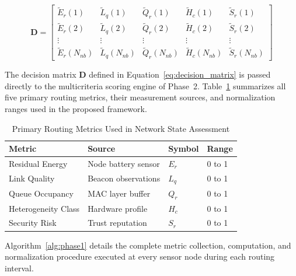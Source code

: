 \documentclass[a4paper,fleqn]{cas-dc}
\numberwithin{equation}{section}
\begin{document}
\begin{equation}
\label{eq:decision_matrix}
\mathbf{D} =
\begin{bmatrix}
\tilde{E}_r(1) & \tilde{L}_q(1) & \tilde{Q}_r(1)
  & \tilde{H}_c(1) & \tilde{S}_r(1) \\
\tilde{E}_r(2) & \tilde{L}_q(2) & \tilde{Q}_r(2)
  & \tilde{H}_c(2) & \tilde{S}_r(2) \\
\vdots & \vdots & \vdots & \vdots & \vdots \\
\tilde{E}_r(N_{nb}) & \tilde{L}_q(N_{nb}) & \tilde{Q}_r(N_{nb})
  & \tilde{H}_c(N_{nb}) & \tilde{S}_r(N_{nb})
\end{bmatrix}
\end{equation}

The decision matrix $\mathbf{D}$ defined in
Equation~\ref{eq:decision_matrix} is passed directly to the
multicriteria scoring engine of Phase~2. Table~\ref{tab:metric_summary}
summarizes all five primary routing metrics, their measurement sources,
and normalization ranges used in the proposed framework.

\begin{table}[htbp]
\centering
\caption{Primary Routing Metrics Used in Network State Assessment}
\label{tab:metric_summary}
\begin{tabular}{p{2.3cm} p{2.5cm} p{1.3cm} p{1.3cm}}
\toprule
\textbf{Metric} & \textbf{Source} &
\textbf{Symbol} & \textbf{Range} \\
\midrule
Residual Energy    & Node battery sensor  & $E_r$ & 0 to 1 \\
Link Quality       & Beacon observations  & $L_q$ & 0 to 1 \\
Queue Occupancy    & MAC layer buffer     & $Q_r$ & 0 to 1 \\
Heterogeneity Class& Hardware profile     & $H_c$ & 0 to 1 \\
Security Risk      & Trust reputation     & $S_r$ & 0 to 1 \\
\bottomrule
\end{tabular}
\end{table}

Algorithm~\ref{alg:phase1} details the complete metric collection,
computation, and normalization procedure executed at every sensor
node during each routing interval.
\end{document}
